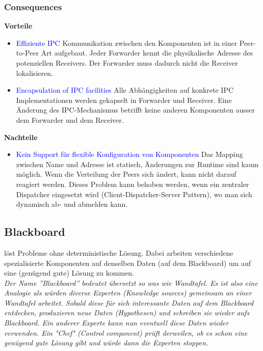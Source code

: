 \subsubsection{Consequences}

\textbf{Vorteile}

\begin{itemize}
    \item \textcolor{blue}{Effiziente IPC} Kommunikation zwischen den Komponenten ist in einer Peer-to-Peer Art aufgebaut. Jeder Forwarder kennt die physikalische Adresse des potenziellen Receivers. Der Forwarder muss dadurch nicht die Receiver lokalisieren.
    \item \textcolor{blue}{Encapsulation of IPC facilities} Alle Abhängigkeiten auf konkrete IPC Implementationen werden gekapselt in Forwarder und Receiver. Eine Änderung des IPC-Mechanismus betrifft keine anderen Komponenten ausser dem Forwarder und dem Receiver.
\end{itemize}

\textbf{Nachteile}

\begin{itemize}
    \item \textcolor{blue}{Kein Support für flexible Konfiguration von Komponenten} Das Mapping zwischen Name und Adresse ist statisch, Änderungen zur Runtime sind kaum möglich. Wenn die Verteilung der Peers sich ändert, kann nicht darauf reagiert werden. Dieses Problem kann behoben werden, wenn ein zentraler Dispatcher eingesetzt wird (Client-Dispatcher-Server Pattern), wo man sich dynamisch ab- und abmelden kann.
\end{itemize}

\subsection{Blackboard}

löst Probleme ohne deterministische Lösung. Dabei arbeiten verschiedene spezialisierte Komponenten auf denselben Daten (auf dem Blackboard) um auf eine (genügend gute) Lösung zu kommen. \\

\textit{Der Name ''Blackboard'' bedeutet übersetzt so was wie Wandtafel. Es ist also eine Analogie als würden diverse Experten (Knowledge sources) gemeinsam an einer Wandtafel arbeitet. Sobald diese für sich interessante Daten auf dem Blackboard entdecken, produzieren neue Daten (Hypothesen) und schreiben sie wieder aufs Blackboard. Ein anderer Experte kann nun eventuell diese Daten wieder verwenden. Ein "Chef" (Control component) prüft derweilen, ob es schon eine genügend gute Lösung gibt und würde dann die Experten stoppen.}

